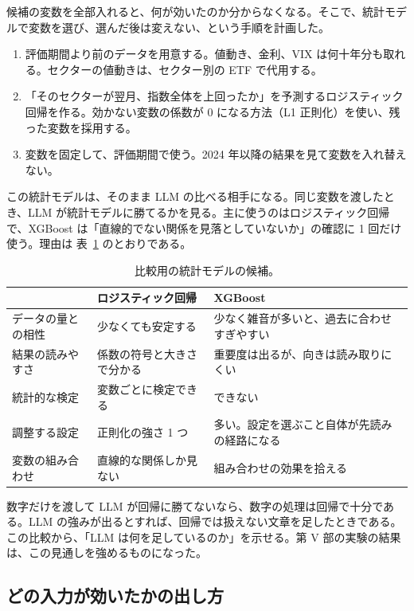\documentclass[xelatex,ja=standard,jafont=hiragino-pron,a4paper,10pt]{bxjsreport}
\newcommand{\tabref}[1]{表~\ref{#1}}
\begin{document}
候補の変数を全部入れると、何が効いたのか分からなくなる。そこで、統計モデルで変数を選び、選んだ後は変えない、という手順を計画した。

\begin{enumerate}
\item 評価期間より前のデータを用意する。値動き、金利、VIX は何十年分も取れる。セクターの値動きは、セクター別の ETF で代用する。
\item 「そのセクターが翌月、指数全体を上回ったか」を予測するロジスティック回帰を作る。効かない変数の係数が 0 になる方法（L1 正則化）を使い、残った変数を採用する。
\item 変数を固定して、評価期間で使う。2024 年以降の結果を見て変数を入れ替えない。
\end{enumerate}

この統計モデルは、そのまま LLM の比べる相手になる。同じ変数を渡したとき、LLM が統計モデルに勝てるかを見る。主に使うのはロジスティック回帰で、XGBoost は「直線的でない関係を見落としていないか」の確認に 1 回だけ使う。理由は \tabref{tab:lrxgb} のとおりである。

\begin{table}[htbp]
\centering
\caption{比較用の統計モデルの候補。}
\label{tab:lrxgb}
\small
\begin{tabular}{p{3.40cm}p{4.80cm}p{4.80cm}}
\toprule
 & ロジスティック回帰 & XGBoost \\
\midrule
データの量との相性 & 少なくても安定する & 少なく雑音が多いと、過去に合わせすぎやすい \\
結果の読みやすさ & 係数の符号と大きさで分かる & 重要度は出るが、向きは読み取りにくい \\
統計的な検定 & 変数ごとに検定できる & できない \\
調整する設定 & 正則化の強さ 1 つ & 多い。設定を選ぶこと自体が先読みの経路になる \\
変数の組み合わせ & 直線的な関係しか見ない & 組み合わせの効果を拾える \\
\bottomrule
\end{tabular}
\end{table}

数字だけを渡して LLM が回帰に勝てないなら、数字の処理は回帰で十分である。LLM の強みが出るとすれば、回帰では扱えない文章を足したときである。この比較から、「LLM は何を足しているのか」を示せる。第 V 部の実験の結果は、この見通しを強めるものになった。

\subsection{どの入力が効いたかの出し方}
\end{document}
